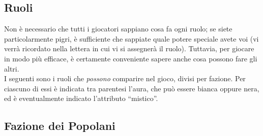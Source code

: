 \documentclass[a4paper,10pt]{article}
\begin{document}
\subsection{Ruoli}

Non è necessario che tutti i giocatori sappiano cosa fa ogni ruolo; se siete
particolarmente pigri, è sufficiente che sappiate quale potere speciale avete
voi (vi verrà ricordato nella lettera in cui vi si assegnerà il ruolo).
Tuttavia, per giocare in modo più efficace, è certamente conveniente sapere
anche cosa possono fare gli altri. \\
I seguenti sono i ruoli che \emph{possono} comparire nel gioco, divisi per
fazione.
Per ciascuno di essi è indicata tra parentesi l'aura, che può essere bianca
oppure nera, ed è eventualmente indicato l'attributo ``mistico''.


\subsection*{Fazione dei Popolani}
\end{document}
